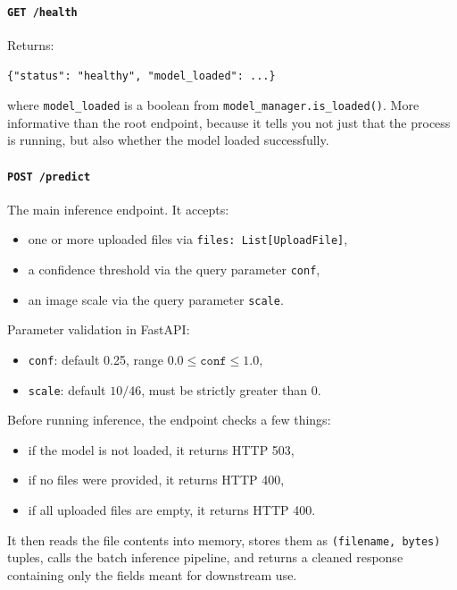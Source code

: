 \documentclass{article}
\begin{document}
\paragraph{\texttt{GET /health}}
Returns:
\begin{center}
\texttt{\{"status": "healthy", "model\_loaded": ...\}}
\end{center}
where \texttt{model\_loaded} is a boolean from \texttt{model\_manager.is\_loaded()}. More informative than the root endpoint, because it tells you not just that the process is running, but also whether the model loaded successfully.

\paragraph{\texttt{POST /predict}}
The main inference endpoint. It accepts:

\begin{itemize}
    \item one or more uploaded files via \texttt{files: List[UploadFile]},
    \item a confidence threshold via the query parameter \texttt{conf},
    \item an image scale via the query parameter \texttt{scale}.
\end{itemize}

Parameter validation in FastAPI:
\begin{itemize}
    \item \texttt{conf}: default 0.25, range $0.0 \leq \texttt{conf} \leq 1.0$,
    \item \texttt{scale}: default $10/46$, must be strictly greater than 0.
\end{itemize}

Before running inference, the endpoint checks a few things:

\begin{itemize}
    \item if the model is not loaded, it returns HTTP 503,
    \item if no files were provided, it returns HTTP 400,
    \item if all uploaded files are empty, it returns HTTP 400.
\end{itemize}

It then reads the file contents into memory, stores them as \texttt{(filename, bytes)} tuples, calls the batch inference pipeline, and returns a cleaned response containing only the fields meant for downstream use.
\end{document}

